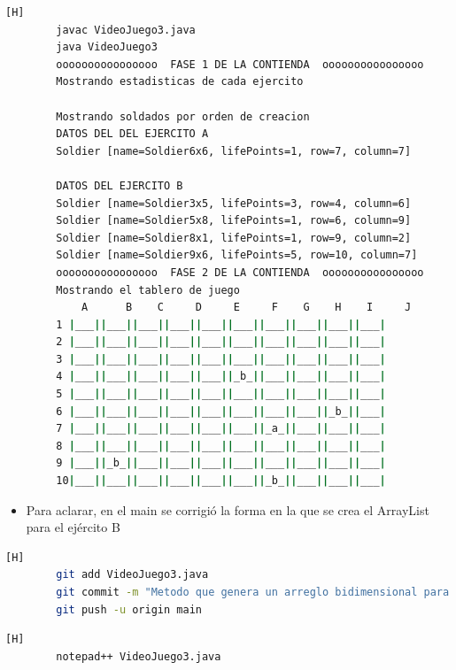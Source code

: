 \documentclass{article}
\begin{document}
	\begin{lstlisting}[language=bash,caption={Compilando y probando las correcciones}][H]
		javac VideoJuego3.java
		java VideoJuego3
		oooooooooooooooo  FASE 1 DE LA CONTIENDA  oooooooooooooooo
		Mostrando estadisticas de cada ejercito
		
		Mostrando soldados por orden de creacion
		DATOS DEL DEL EJERCITO A
		Soldier [name=Soldier6x6, lifePoints=1, row=7, column=7]
		
		DATOS DEL EJERCITO B
		Soldier [name=Soldier3x5, lifePoints=3, row=4, column=6]
		Soldier [name=Soldier5x8, lifePoints=1, row=6, column=9]
		Soldier [name=Soldier8x1, lifePoints=1, row=9, column=2]
		Soldier [name=Soldier9x6, lifePoints=5, row=10, column=7]
		oooooooooooooooo  FASE 2 DE LA CONTIENDA  oooooooooooooooo
		Mostrando el tablero de juego
	 		A      B    C     D     E     F    G    H    I     J
		1 |___||___||___||___||___||___||___||___||___||___|
		2 |___||___||___||___||___||___||___||___||___||___|
		3 |___||___||___||___||___||___||___||___||___||___|
		4 |___||___||___||___||___||_b_||___||___||___||___|
		5 |___||___||___||___||___||___||___||___||___||___|
		6 |___||___||___||___||___||___||___||___||_b_||___|
		7 |___||___||___||___||___||___||_a_||___||___||___|
		8 |___||___||___||___||___||___||___||___||___||___|
		9 |___||_b_||___||___||___||___||___||___||___||___|
		10|___||___||___||___||___||___||_b_||___||___||___|
	\end{lstlisting}
	\begin{itemize}	
		\item Para aclarar, en el main se corrigió la forma en la que se crea el ArrayList para el ejército B
	\end{itemize}

	\begin{lstlisting}[language=bash,caption={Commit: Metodo que genera un arreglo bidimensional para el ejercito B}][H]
		git add VideoJuego3.java
		git commit -m "Metodo que genera un arreglo bidimensional para el ejercito B"			
		git push -u origin main
	\end{lstlisting}
	
	
	
	
	
	
	\begin{lstlisting}[language=bash,caption={Se implementa el método que busca al soldado con mayor puntaje de vida}][H]
		notepad++ VideoJuego3.java
	\end{lstlisting}
	
\end{document}
